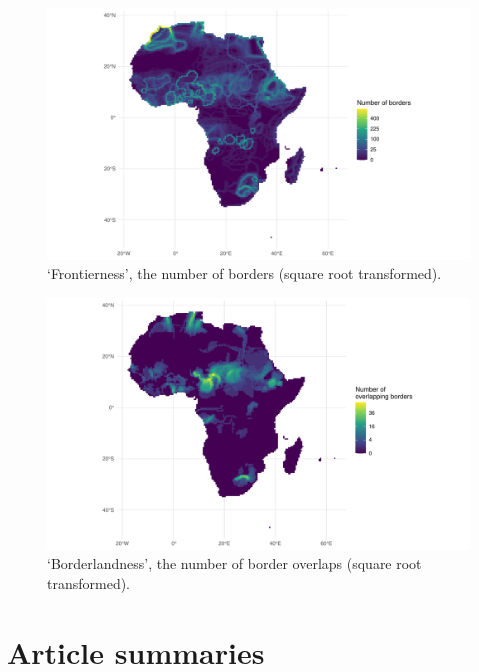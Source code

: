 \begin{figure}[hpbt]
	\centering
	\includegraphics[width=\linewidth]{img/frontierplot.pdf}
	\caption{`Frontierness', the number of borders (square root transformed).}%
	\label{fig:borders}
\end{figure}

\begin{figure}[hpbt]
	\centering
	\includegraphics[width=\linewidth]{img/borderplot.pdf}
	\caption{`Borderlandness', the number of border overlaps (square root transformed).}%
	\label{fig:overlaps}
\end{figure}

\section{Article summaries} \label{Article summaries}

